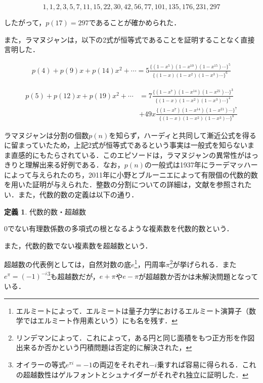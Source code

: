 \documentclass[10pt, a5paper, twoside]{jsarticle}
\theoremstyle{definition}
\newtheorem{dfn}{定義}
\begin{document}
				$$1, 1, 2, 3, 5, 7, 11, 15, 22, 30, 42, 56, 77, 101, 135, 176, 231, 297$$

			したがって，$p(17) = 297$であることが確かめられた．

			また，ラマヌジャンは，以下の2式が恒等式であることを証明することなく直接言明した\cite{ram}．

			\begin{align*}
				p(4) + p(9) x + p(14) x^2 + \cdots = 5 \frac{ \{ (1 - x^5)(1 - x^{10})(1 - x^{15}) \cdots \}^5 }{ \{ (1 - x)(1 - x^2)(1 - x^3) \cdots \}^6 }
			\end{align*}

			\begin{align*}
				p(5) + p(12) x + p(19) x^2 + \cdots &= 7 \frac{ \{ (1 - x^7)(1 - x^{14})(1 - x^{21}) \cdots \}^3 }{ \{ (1 - x)(1 - x^2)(1 - x^3) \cdots \}^4 } \\ &+ 49 x \frac{ \{ (1 - x^7)(1 - x^{14})(1 - x^{21}) \cdots \}^7 }{ \{ (1 - x)(1 - x^2)(1 - x^3) \cdots \}^8 }
			\end{align*}

			ラマヌジャンは分割の個数$p(n)$を知らず，ハーディと共同して漸近公式を得るに留まっていたため，上記2式が恒等式であるという事実は一般式を知らないまま直感的にもたらされている．このエピソードは，ラマヌジャンの異常性がはっきりと理解出来る好例である．なお，$p(n)$の一般式は1937年にラーデマッハーによって与えられたのち，2011年に小野とブルーニエによって有限個の代数的数を用いた証明が与えられた．整数の分割についての詳細は，文献\cite{ae}を参照されたい．また，代数的数の定義は以下の通り．

			\begin{dfn}

				代数的数・超越数

				0でない有理数係数の多項式の根となるような複素数を代数的数という．

				また，代数的数でない複素数を超越数という．
				
			\end{dfn}

			超越数の代表例としては，自然対数の底$e$\footnote{エルミートによって．エルミートは量子力学におけるエルミート演算子（数学ではエルミート作用素という）にも名を残す．}，円周率$\pi$\footnote{リンデマンによって．これによって，ある円と同じ面積をもつ正方形を作図出来るか否かという円積問題は否定的に解決された，}が挙げられる．また$e^{\pi} = (-1)^{-i}$\footnote{オイラーの等式$e^{\pi i} = -1$の両辺をそれぞれ$-i$乗すれば容易に得られる．これの超越数性はゲルフォントとシュナイダーがそれぞれ独立に証明した．}も超越数だが，$e + \pi$や$e - \pi$が超越数か否かは未解決問題となっている．
\end{document}
